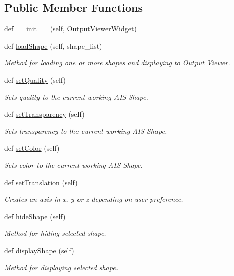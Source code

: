 \subsection*{Public Member Functions}
\begin{DoxyCompactItemize}
\item 
def \hyperlink{a00094_aeafd1ea7cbe63a409e51e546db403bfd}{\+\_\+\+\_\+init\+\_\+\+\_\+} (self, Output\+Viewer\+Widget)
\item 
def \hyperlink{a00094_a8833b4dba535cb76318777c031cf08b5}{load\+Shape} (self, shape\+\_\+list)
\begin{DoxyCompactList}\small\item\em Method for loading one or more shapes and displaying to Output Viewer. \end{DoxyCompactList}\item 
def \hyperlink{a00094_abe8c1dbcfe98b9f86a0560dd1e8b853a}{set\+Quality} (self)
\begin{DoxyCompactList}\small\item\em Sets quality to the current working A\+IS Shape. \end{DoxyCompactList}\item 
def \hyperlink{a00094_a8d7fdd0bde28afe34d3793c8bcf060fa}{set\+Transparency} (self)
\begin{DoxyCompactList}\small\item\em Sets transparency to the current working A\+IS Shape. \end{DoxyCompactList}\item 
def \hyperlink{a00094_ac659823f3085963daf751a6a94b366a7}{set\+Color} (self)
\begin{DoxyCompactList}\small\item\em Sets color to the current working A\+IS Shape. \end{DoxyCompactList}\item 
def \hyperlink{a00094_a1cab1ea26a1cd0091d88106b6b4715bb}{set\+Translation} (self)
\begin{DoxyCompactList}\small\item\em Creates an axis in x, y or z depending on user preference. \end{DoxyCompactList}\item 
def \hyperlink{a00094_ad4293087adb512ea61fe0c3429c0e08c}{hide\+Shape} (self)
\begin{DoxyCompactList}\small\item\em Method for hiding selected shape. \end{DoxyCompactList}\item 
def \hyperlink{a00094_aba26c11e7e7ec6c2c6709a27cbeaaf69}{display\+Shape} (self)
\begin{DoxyCompactList}\small\item\em Method for displaying selected shape. \end{DoxyCompactList}\end{DoxyCompactItemize}
